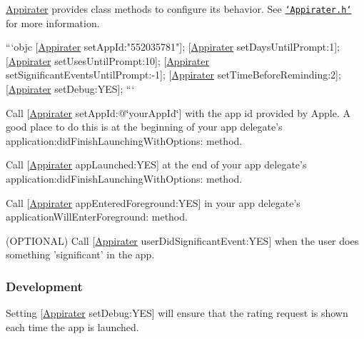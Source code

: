 \begin{DoxyEnumerate}
\item \hyperlink{interface_appirater}{Appirater} provides class methods to configure its behavior. See \href{https://github.com/arashpayan/appirater/blob/master/Appirater.h}{\tt `\-Appirater.h`} for more information.
\end{DoxyEnumerate}

```objc \mbox{[}\hyperlink{interface_appirater}{Appirater} set\-App\-Id\-:"552035781"\mbox{]}; \mbox{[}\hyperlink{interface_appirater}{Appirater} set\-Days\-Until\-Prompt\-:1\mbox{]}; \mbox{[}\hyperlink{interface_appirater}{Appirater} set\-Uses\-Until\-Prompt\-:10\mbox{]}; \mbox{[}\hyperlink{interface_appirater}{Appirater} set\-Significant\-Events\-Until\-Prompt\-:-\/1\mbox{]}; \mbox{[}\hyperlink{interface_appirater}{Appirater} set\-Time\-Before\-Reminding\-:2\mbox{]}; \mbox{[}\hyperlink{interface_appirater}{Appirater} set\-Debug\-:Y\-E\-S\mbox{]}; ```


\begin{DoxyEnumerate}
\item Call {\ttfamily \mbox{[}\hyperlink{interface_appirater}{Appirater} set\-App\-Id\-:@\char`\"{}your\-App\-Id\char`\"{}\mbox{]}} with the app id provided by Apple. A good place to do this is at the beginning of your app delegate's {\ttfamily application\-:did\-Finish\-Launching\-With\-Options\-:} method.
\item Call {\ttfamily \mbox{[}\hyperlink{interface_appirater}{Appirater} app\-Launched\-:Y\-E\-S\mbox{]}} at the end of your app delegate's {\ttfamily application\-:did\-Finish\-Launching\-With\-Options\-:} method.
\item Call {\ttfamily \mbox{[}\hyperlink{interface_appirater}{Appirater} app\-Entered\-Foreground\-:Y\-E\-S\mbox{]}} in your app delegate's {\ttfamily application\-Will\-Enter\-Foreground\-:} method.
\item (O\-P\-T\-I\-O\-N\-A\-L) Call {\ttfamily \mbox{[}\hyperlink{interface_appirater}{Appirater} user\-Did\-Significant\-Event\-:Y\-E\-S\mbox{]}} when the user does something 'significant' in the app.
\end{DoxyEnumerate}

\subsubsection*{Development}

Setting {\ttfamily \mbox{[}\hyperlink{interface_appirater}{Appirater} set\-Debug\-:Y\-E\-S\mbox{]}} will ensure that the rating request is shown each time the app is launched.


